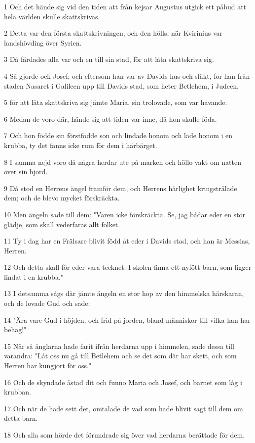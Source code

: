 \par 1 Och det hände sig vid den tiden att från kejsar Augustus utgick ett påbud att hela världen skulle skattskrivas.
\par 2 Detta var den första skattskrivningen, och den hölls, när Kvirinius var landshövding över Syrien.
\par 3 Då färdades alla var och en till sin stad, för att låta skattskriva sig.
\par 4 Så gjorde ock Josef; och eftersom han var av Davids hus och släkt, for han från staden Nasaret i Galileen upp till Davids stad, som heter Betlehem, i Judeen,
\par 5 för att låta skattskriva sig jämte Maria, sin trolovade, som var havande.
\par 6 Medan de voro där, hände sig att tiden var inne, då hon skulle föda.
\par 7 Och hon födde sin förstfödde son och lindade honom och lade honom i en krubba, ty det fanns icke rum för dem i härbärget.
\par 8 I samma nejd voro då några herdar ute på marken och höllo vakt om natten över sin hjord.
\par 9 Då stod en Herrens ängel framför dem, och Herrens härlighet kringstrålade dem; och de blevo mycket förskräckta.
\par 10 Men ängeln sade till dem: "Varen icke förskräckta. Se, jag bådar eder en stor glädje, som skall vederfaras allt folket.
\par 11 Ty i dag har en Frälsare blivit född åt eder i Davids stad, och han är Messias, Herren.
\par 12 Och detta skall för eder vara tecknet: I skolen finna ett nyfött barn, som ligger lindat i en krubba."
\par 13 I detsamma sågs där jämte ängeln en stor hop av den himmelska härskaran, och de lovade Gud och sade:
\par 14 "Ära vare Gud i höjden, och frid på jorden, bland människor till vilka han har behag!"
\par 15 När så änglarna hade farit ifrån herdarna upp i himmelen, sade dessa till varandra: "Låt oss nu gå till Betlehem och se det som där har skett, och som Herren har kungjort för oss."
\par 16 Och de skyndade åstad dit och funno Maria och Josef, och barnet som låg i krubban.
\par 17 Och när de hade sett det, omtalade de vad som hade blivit sagt till dem om detta barn.
\par 18 Och alla som hörde det förundrade sig över vad herdarna berättade för dem.
